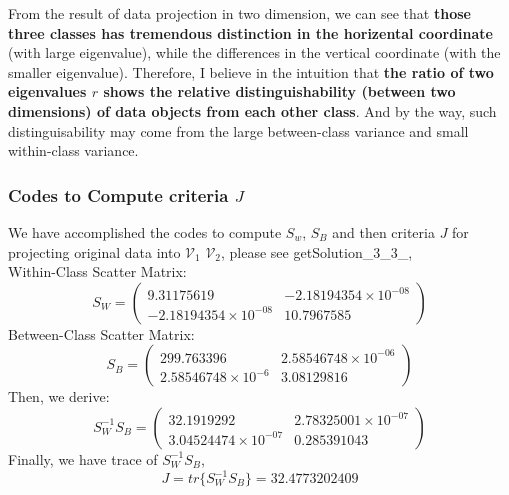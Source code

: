 \documentclass[11pt,a4paper]{article}
\newcommand{\htab}{\hspace*{0.63cm}}
\newcommand{\V}{\mathcal{V}}
\begin{document}
    \htab From the result of data projection in two dimension, we can see that \textbf{those three classes has tremendous distinction in the horizental coordinate} (with large eigenvalue), while the differences in the vertical coordinate (with the smaller eigenvalue). Therefore, I believe in the intuition that \textbf{the ratio of two eigenvalues $r$ shows the relative distinguishability (between two dimensions) of data objects from each other class}. And by the way, such distinguisability may come from the large between-class variance and small within-class variance.
\newpage
\subsubsection{Codes to Compute criteria $J$}
\htab We have accomplished the codes to compute $S_{w}$, $S_{B}$ and then criteria $J$ for projecting original data into $\V_{1}$ $\V_{2}$, please see getSolution\_3\_3\_, \\
\htab Within-Class Scatter Matrix:\\
$$ S_{W} = \begin{pmatrix}   
    9.31175619 &  -2.18194354\times 10^{-08} \\
    -2.18194354\times 10^{-08}   &  10.7967585  
 \end{pmatrix} $$
\htab Between-Class Scatter Matrix:\\
$$ S_{B} = \begin{pmatrix}
    299.763396  & 2.58546748\times 10^{-06}  \\
    2.58546748\times 10^{-6}  &  3.08129816  
\end{pmatrix} $$
\htab Then, we derive: \\
$$ S_{W}^{-1} S_{B} = \begin{pmatrix}
    32.1919292  &  2.78325001\times 10^{-07} \\
    3.04524474\times 10^{-07}   & 0.285391043
    \end{pmatrix} $$
\htab Finally, we have trace of $ S_{W}^{-1} S_{B} $,
$$ J = tr\{S_{W}^{-1}S_{B}\} = 32.4773202409 $$
\end{document}
